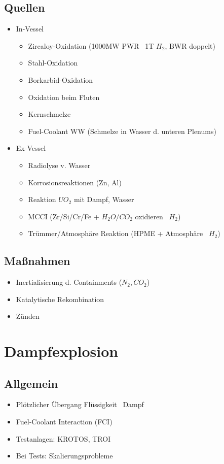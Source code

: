 \documentclass[12pt]{article}
\begin{document}
\subsection{Quellen}
\begin{itemize}
  \item In-Vessel
  \begin{itemize}
    \item Zircaloy-Oxidation (1000MW PWR \textrightarrow\ 1T \(H_2\), BWR doppelt)
    \item Stahl-Oxidation
    \item Borkarbid-Oxidation
    \item Oxidation beim Fluten
    \item Kernschmelze
    \item Fuel-Coolant WW (Schmelze in Wasser d. unteren Plenums)
  \end{itemize}
  \item Ex-Vessel
  \begin{itemize}
    \item Radiolyse v. Wasser
    \item Korrosionsreaktionen (Zn, Al)
    \item Reaktion \(UO_2\) mit Dampf, Wasser
    \item MCCI (Zr/Si/Cr/Fe + \(H_2O/CO_2\) oxidieren \textrightarrow\ \(H_2\))
    \item Trümmer/Atmosphäre Reaktion (HPME + Atmosphäre \textrightarrow\ \(H_2\))
  \end{itemize}
\end{itemize}

\subsection{Maßnahmen}
\begin{itemize}
  \item Inertialisierung d. Containments (\(N_2, CO_2\))
  \item Katalytische Rekombination
  \item Zünden
\end{itemize}

\section{Dampfexplosion}

\subsection{Allgemein}
\begin{itemize}
  \item Plötzlicher Übergang Flüssigkeit \textrightarrow\ Dampf
  \item Fuel-Coolant Interaction (FCI)
  \item Testanlagen: KROTOS, TROI
  \item Bei Tests: Skalierungsprobleme
\end{itemize}
\end{document}
